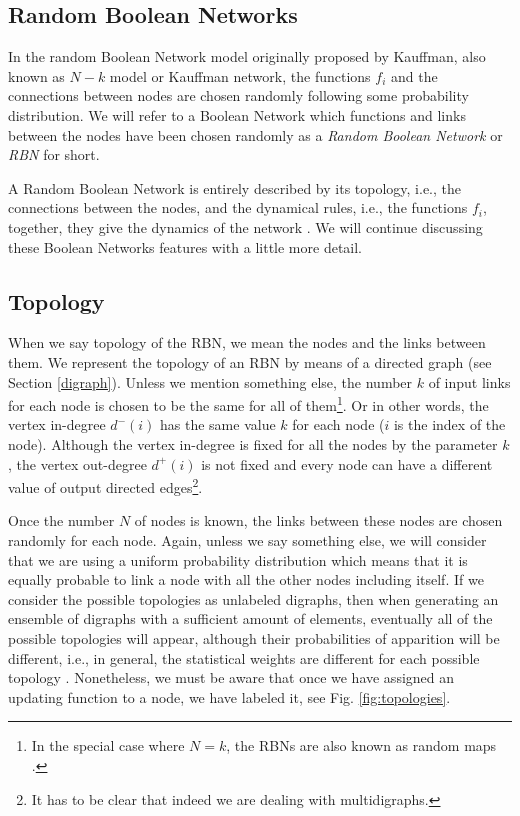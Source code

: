 \subsection{Random Boolean Networks}
In the random Boolean Network model originally proposed by Kauffman, also known as $N-k$ model or Kauffman network, the functions $f_{i}$ and the connections between nodes are chosen randomly following some probability distribution. We will refer to a Boolean Network which functions and links between the nodes have been chosen randomly as a \textit{Random Boolean Network} or \textit{RBN} for short.

A Random Boolean Network is entirely described by its topology, i.e., the connections between the nodes, and the dynamical rules, i.e., the functions $f_{i}$, together, they give the dynamics of the network \cite{rbn_barbara}. We will continue discussing these Boolean Networks features with a little more detail.

\subsection{Topology}
\label{topology_section}
When we say topology of the RBN, we mean the nodes and the links between them. We represent the topology of an RBN by means of a directed graph (see Section \ref{digraph}). Unless we mention something else, the number $k$ of input links for each node is chosen to be the same for all of them\footnote{In the special case where $N=k$, the RBNs are also known as random maps \cite{rbn_carlos}.}. Or in other words, the vertex in-degree $ d^{-} (i)$ has the same value $k$ for each node ($i$ is the index of the node). Although the vertex in-degree is fixed for all the nodes by the parameter $k$, the vertex out-degree $ d^{+} (i)$ is not fixed and every node can have a different value of output directed edges\footnote{It has to be clear that indeed we are dealing with multidigraphs.}.

Once the number $N$ of nodes is known, the links between these nodes are chosen randomly for each node. Again, unless we say something else, we will consider that we are using a uniform probability distribution which means that it is equally probable to link a node with all the other nodes including itself. If we consider the possible topologies as unlabeled digraphs, then when generating an ensemble of digraphs with a sufficient amount of elements, eventually all of the possible topologies will appear, although their probabilities of apparition will be different, i.e., in general, the statistical weights are different for each possible topology \cite{rbn_barbara}. Nonetheless, we must be aware that once we have assigned an updating function to a node, we have labeled it, see Fig. \ref{fig:topologies}.

